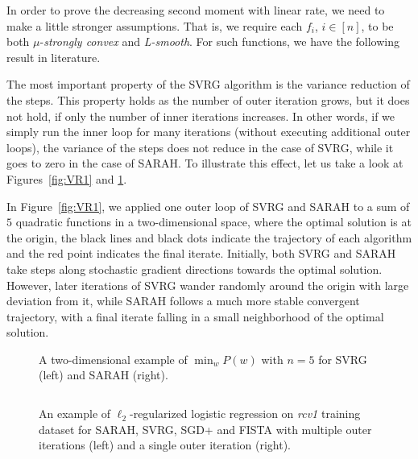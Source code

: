 \documentclass{article}
\newcommand{\setn}{[n]}
\begin{document}
In order to prove the decreasing second moment with linear rate, we need to make a little stronger assumptions. That is, we require each $f_i$, $i \in \setn$, to be both $\mu$-\emph{strongly convex} and \emph{L-smooth}. For such functions, we have the following result in literature.
\fi


The most important property of the SVRG algorithm is  the variance reduction of the steps. This property holds as the number of outer iteration grows, but it does not hold, if only the number of inner iterations increases.  In other words, if we simply run the inner loop for many iterations (without executing additional outer loops), the variance of the steps does not reduce in the case of SVRG, while it goes to zero in the case of SARAH. 
To illustrate this effect, let us take a look at Figures~\ref{fig:VR1} and \ref{fig:VR2}. 

In Figure~\ref{fig:VR1}, we applied one outer loop of SVRG and SARAH to a sum of $5$  quadratic functions in a two-dimensional space, where the optimal solution is at the origin, the black lines and black dots indicate the trajectory of each algorithm and the red point indicates the final iterate. 
Initially, both SVRG and SARAH take steps along stochastic gradient directions towards the optimal solution. However, later iterations of SVRG wander randomly around the origin with large deviation from it, while SARAH follows a much more stable convergent trajectory, with a final iterate falling in a small neighborhood of the optimal solution. 

\begin{figure}  
\centering
 \hspace{4mm}
  \caption{\footnotesize A two-dimensional example of $\min_w P(w)$ with $n=5$ for SVRG (left) and SARAH (right).}
  \label{fig:VR1}
  
$\ $\\$\ $\\ 
\centering
 \hspace{4mm}
  \caption{\footnotesize An example of $\ell_2$-regularized logistic regression on \emph{rcv1} training dataset for SARAH, SVRG, SGD+ and FISTA with multiple outer iterations (left) and a single outer iteration (right).}
  \label{fig:VR2}
 \end{figure}
\end{document}

